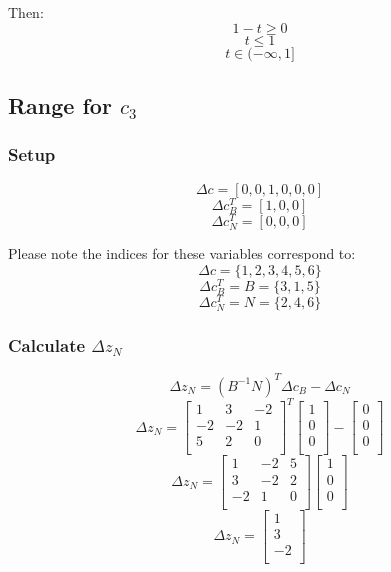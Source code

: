 \documentclass[14pt]{extarticle}
\begin{document}
\bigskip Then:
\[
    1 - t \geq 0
\]
\[
    t \leq 1
\]
\[
    t \in (-\infty, 1]
\]

\subsection*{Range for $c_3$}
\subsubsection*{Setup}
\[
    \Delta c = [0, 0, 1, 0, 0, 0]
\]
\[
    \Delta c^T_B = [1, 0, 0]
\]
\[
    \Delta c^T_N = [0, 0, 0]
\]

\bigskip Please note the indices for these variables correspond to:
\[
    \Delta c = \{1, 2, 3, 4, 5, 6\}
\]
\[
    \Delta c^T_B = B = \{3, 1, 5\}
\]
\[
    \Delta c^T_N = N = \{2, 4, 6\}
\]

\subsubsection*{Calculate $\Delta z_N$}
\[
    \Delta z_N = (B^{-1}N)^T \Delta c_B - \Delta c_N
\]
\[
    \Delta z_N = \begin{bmatrix}
        1 & 3 & -2 \\
        -2 & -2 & 1 \\
        5 & 2 & 0 \\
    \end{bmatrix}^T
    \begin{bmatrix}
        1 \\
        0 \\
        0 \\
    \end{bmatrix}
    - \begin{bmatrix}
        0 \\
        0 \\
        0 \\
    \end{bmatrix}
\]
\[
    \Delta z_N = \begin{bmatrix}
        1 & -2 & 5 \\
        3 & -2 & 2 \\
        -2 & 1 & 0 \\
    \end{bmatrix}
    \begin{bmatrix}
        1 \\
        0 \\
        0 \\
    \end{bmatrix}
\]
\[
    \Delta z_N = \begin{bmatrix}
        1 \\
        3 \\
        -2 \\
    \end{bmatrix}
\]
\end{document}
